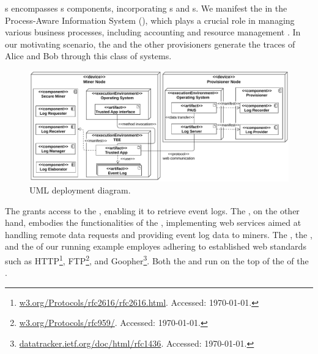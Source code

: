 s encompasses s components, incorporating s and s.  %
We manifest the  in the Process-Aware Information System (), which plays a crucial role in managing various business processes, including accounting and resource management \cite{Dumas.etal/2018:FundamentalsofBPM}. In our motivating scenario, the  and the other provisioners generate the traces of Alice and Bob through this class of systems.
\begin{figure}[t]
	\centering
	\includegraphics[width=1\linewidth]{content/figures/deploymentdiagram3.pdf}
	\caption{UML deployment diagram.}
	\label{fig:deployment_diagram}
\end{figure}
The  grants access to the , enabling it to retrieve event logs. The , on the other hand, embodies the functionalities of the , implementing web services aimed at handling remote data requests and providing event log data to miners. The , the , and the  of our running example employes  adhering to established web standards such as HTTP\footnote{\url{w3.org/Protocols/rfc2616/rfc2616.html}. Accessed: \today.}, FTP\footnote{\url{w3.org/Protocols/rfc959/}. Accessed: \today.}, and Goopher\footnote{\url{datatracker.ietf.org/doc/html/rfc1436}. Accessed: \today.}. Both the  and  run on the top of the  of the .

